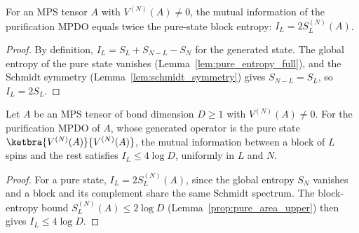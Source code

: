 \begin{lemma}
    \label{lem:mutual_info_doubled}
    \leanok
    For an MPS tensor $A$ with $V^{(N)}(A)\neq0$, the mutual information of the
    purification MPDO equals twice the pure-state block entropy:
    $I_L=2S_L^{(N)}(A)$.
\end{lemma}
\begin{proof}\leanok
    By definition, $I_L=S_L+S_{N-L}-S_N$ for the generated state. The global
    entropy of the pure state vanishes (Lemma~\ref{lem:pure_entropy_full}), and
    the Schmidt symmetry (Lemma~\ref{lem:schmidt_symmetry}) gives
    $S_{N-L}=S_L$, so $I_L=2S_L$.
\end{proof}

\begin{lemma}\label{prop:pure_mutual_info_bound}
    \leanok
    Let $A$ be an MPS tensor of bond dimension $D\geq1$ with
    $V^{(N)}(A)\neq0$. For the purification MPDO of $A$, whose generated
    operator is the pure state
    $\ketbra{V^{(N)}(A)}{V^{(N)}(A)}$, the mutual information between a block
    of $L$ spins and the rest satisfies $I_L\leq4\log D$, uniformly in $L$ and
    $N$.
\end{lemma}
\begin{proof}\leanok
    For a pure state, $I_L=2S_L^{(N)}(A)$, since the global entropy $S_N$
    vanishes and a block and its complement share the same Schmidt spectrum.
    The block-entropy bound $S_L^{(N)}(A)\leq2\log D$
    (Lemma~\ref{prop:pure_area_upper}) then gives $I_L\leq4\log D$.
\end{proof}
